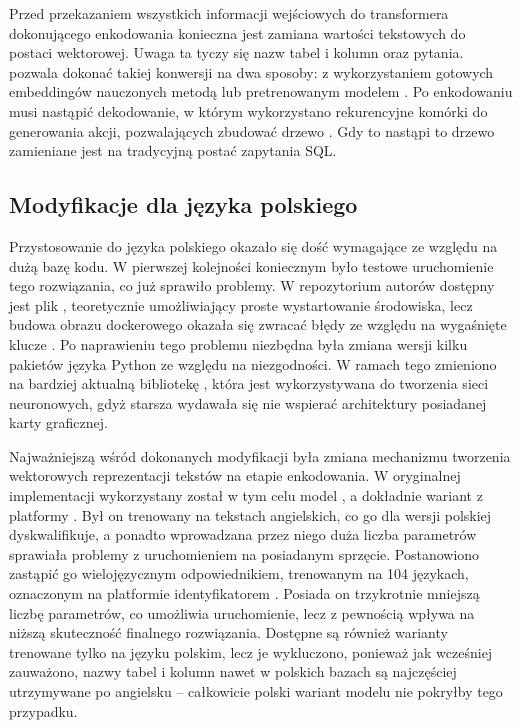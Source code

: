 Przed przekazaniem wszystkich informacji wejściowych do transformera dokonującego enkodowania konieczna jest zamiana wartości tekstowych do postaci wektorowej. Uwaga ta tyczy się nazw tabel i kolumn oraz pytania.  pozwala dokonać takiej konwersji na dwa sposoby: z wykorzystaniem gotowych embeddingów nauczonych metodą  lub pretrenowanym modelem . Po enkodowaniu musi nastąpić dekodowanie, w którym wykorzystano rekurencyjne komórki  do generowania akcji, pozwalających zbudować drzewo . Gdy to nastąpi to drzewo zamieniane jest na tradycyjną postać zapytania SQL.

\subsection{Modyfikacje dla języka polskiego}
Przystosowanie  do języka polskiego okazało się dość wymagające ze względu na dużą bazę kodu. W pierwszej kolejności koniecznym było testowe uruchomienie tego rozwiązania, co już sprawiło problemy. W repozytorium autorów dostępny jest plik , teoretycznie umożliwiający proste wystartowanie środowiska, lecz budowa obrazu dockerowego okazała się zwracać błędy ze względu na wygaśnięte klucze . Po naprawieniu tego problemu niezbędna była zmiana wersji kilku pakietów języka Python ze względu na niezgodności. W ramach tego zmieniono na bardziej aktualną bibliotekę , która jest wykorzystywana do tworzenia sieci neuronowych, gdyż starsza wydawała się nie wspierać architektury posiadanej karty graficznej.

Najważniejszą wśród dokonanych modyfikacji była zmiana mechanizmu tworzenia wektorowych reprezentacji tekstów na etapie enkodowania. W oryginalnej implementacji wykorzystany został w tym celu model , a dokładnie wariant  z platformy . Był on trenowany na tekstach angielskich, co go dla wersji polskiej dyskwalifikuje, a ponadto wprowadzana przez niego duża liczba parametrów sprawiała problemy z uruchomieniem na posiadanym sprzęcie. Postanowiono zastąpić go wielojęzycznym odpowiednikiem, trenowanym na 104 językach, oznaczonym na platformie  identyfikatorem . Posiada on trzykrotnie mniejszą liczbę parametrów, co umożliwia uruchomienie, lecz z pewnością wpływa na niższą skuteczność finalnego rozwiązania. Dostępne są również warianty trenowane tylko na języku polskim, lecz je wykluczono, ponieważ jak wcześniej zauważono, nazwy tabel i kolumn nawet w polskich bazach są najczęściej utrzymywane po angielsku -- całkowicie polski wariant modelu  nie pokryłby tego przypadku. 

